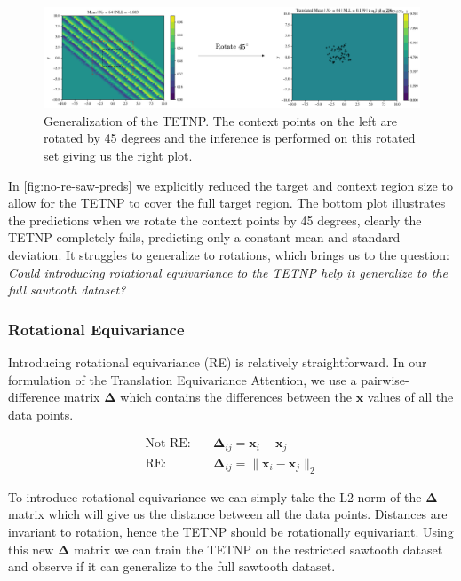 \documentclass[../../main.tex]{subfiles}
\begin{document}
\begin{figure}[H]
    \centering
    \includegraphics[width=1\linewidth]{./fig/res-saw/no-re.png}
    \caption{Generalization of the TETNP. The context points on the left are rotated by 45 degrees and  the inference is performed on this rotated set giving us the right plot.}
    \label{fig:no-re-saw-preds}
\end{figure}

In \autoref{fig:no-re-saw-preds} we explicitly reduced the target and context region size to allow for the TETNP to cover the full target region. The bottom plot illustrates the predictions when we rotate the context points by 45 degrees, clearly the TETNP completely fails, predicting only a constant mean and standard deviation. It struggles to generalize to rotations, which brings us to the question: \emph{Could introducing rotational equivariance to the TETNP help it generalize to the full sawtooth dataset?}

\subsubsection{Rotational Equivariance}

Introducing rotational equivariance (RE) is relatively straightforward. In our formulation of the Translation Equivariance Attention, we use a pairwise-difference matrix $\bm{\Delta}$ which contains the differences between the $\bm{x}$ values of all the data points.

\begin{align}
    \text{Not RE}: \quad &\bm{\Delta}_{ij} = \bm{x}_i - \bm{x}_j\\
    \text{RE}: \quad &\bm{\Delta}_{ij} = \|\bm{x}_i - \bm{x}_j\|_2
\end{align}

To introduce rotational equivariance we can simply take the L2 norm of the $\bm{\Delta}$ matrix which will give us the distance between all the data points. Distances are invariant to rotation, hence the TETNP should be rotationally equivariant. Using this new $\bm{\Delta}$ matrix we can train the TETNP on the restricted sawtooth dataset and observe if it can generalize to the full sawtooth dataset.
\end{document}
